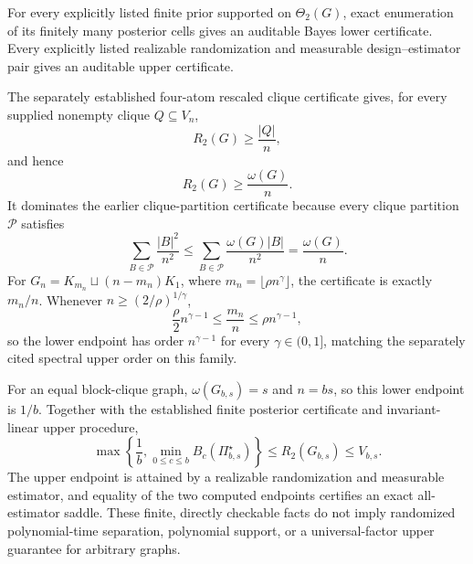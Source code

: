 For every explicitly listed finite prior supported on \(\Theta_2(G)\), exact enumeration of its finitely many posterior cells gives an auditable Bayes lower certificate.  Every explicitly listed realizable randomization and measurable design--estimator pair gives an auditable upper certificate.

The separately established four-atom rescaled clique certificate gives, for every supplied nonempty clique \(Q\subseteq V_n\),
\[
R_2(G)\geq \frac{|Q|}{n},
\]
and hence
\[
R_2(G)\geq \frac{\omega(G)}{n}.
\]
It dominates the earlier clique-partition certificate because every clique partition \(\mathcal P\) satisfies
\[
\sum_{B\in\mathcal P}\frac{|B|^2}{n^2}
\leq
\sum_{B\in\mathcal P}\frac{\omega(G)|B|}{n^2}
=\frac{\omega(G)}{n}.
\]
For \(G_n=K_{m_n}\sqcup(n-m_n)K_1\), where \(m_n=\lfloor\rho n^\gamma\rfloor\), the certificate is exactly \(m_n/n\).  Whenever \(n\geq(2/\rho)^{1/\gamma}\),
\[
\frac{\rho}{2}n^{\gamma-1}
\leq \frac{m_n}{n}
\leq \rho n^{\gamma-1},
\]
so the lower endpoint has order \(n^{\gamma-1}\) for every \(\gamma\in(0,1]\), matching the separately cited spectral upper order on this family.

For an equal block-clique graph, \(\omega(G_{b,s})=s\) and \(n=bs\), so this lower endpoint is \(1/b\).  Together with the established finite posterior certificate and invariant-linear upper procedure,
\[
\max\left\{\frac1b,\min_{0\leq c\leq b}B_c(\Pi_{b,s}^{\star})\right\}
\leq R_2(G_{b,s})\leq V_{b,s}.
\]
The upper endpoint is attained by a realizable randomization and measurable estimator, and equality of the two computed endpoints certifies an exact all-estimator saddle.  These finite, directly checkable facts do not imply randomized polynomial-time separation, polynomial support, or a universal-factor upper guarantee for arbitrary graphs.